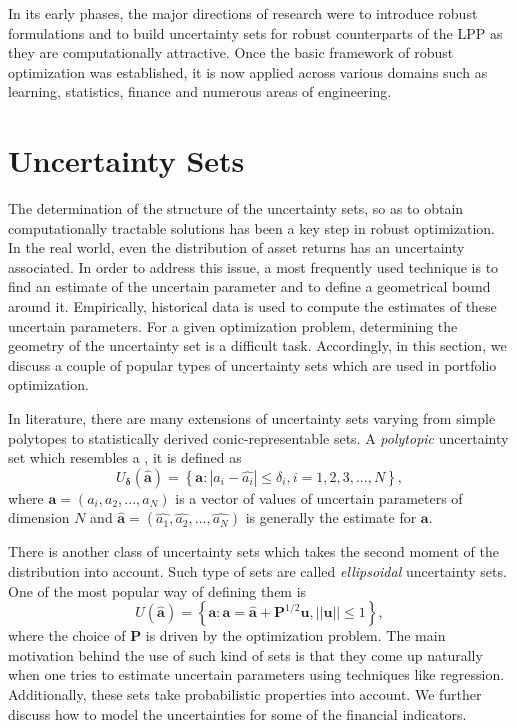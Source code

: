 In its early phases, the major directions of research were to introduce robust formulations and to build uncertainty sets for robust counterparts of the LPP as they are computationally attractive. Once the basic framework of robust optimization was established, it is now applied across various domains such as learning, statistics, finance and numerous areas of engineering.

\section{Uncertainty Sets}

The determination of the structure of the uncertainty sets, so as to obtain computationally tractable solutions has been a key step in robust optimization. In the real world, even the distribution of asset returns has an uncertainty associated. In order to address this issue, a most frequently used technique is to find an estimate of the uncertain parameter and to define a geometrical bound around it. Empirically, historical data is used to compute the estimates of these uncertain parameters. For a given optimization problem, determining the geometry of the uncertainty set is a difficult task. Accordingly, in this section, we discuss a couple of popular types of uncertainty sets which are used in portfolio optimization.

In literature, there are many extensions of uncertainty sets varying from simple polytopes to statistically derived conic-representable sets. A \textit{polytopic} \cite{fabozzi} uncertainty set which resembles a , it is defined as
\begin{equation}
\label{eqn:box}
U_{\mathbf{\delta}}(\hat{\mathbf{a}}) = \left\{ \mathbf{a} : | a_i - \hat{a_i}| \leq \delta_i, i = 1,2,3,...,N \right\},
\end{equation}
where $\mathbf{a} = (a_i, a_2, ..., a_N)$ is a vector of values of uncertain parameters of dimension $N$ and $\mathbf{\hat{a}} = (\hat{a_1}, \hat{a_2}, ... , \hat{a_N})$ is generally the estimate for $\mathbf{a}$.

There is another class of uncertainty sets which takes the second moment of the distribution into account. Such type of sets are called \textit{ellipsoidal} uncertainty sets. One of the most popular way of defining them \cite{fabozzi} is
\begin{equation}
\label{eqn:ellipse}
U(\hat{\mathbf{a}}) = \left\{ \mathbf{a} : \mathbf{a} = \hat{\mathbf{a}} + \mathbf{P}^{1/2}\mathbf{u}, ||\mathbf{u}||\leq 1 \right\},
\end{equation}
where the choice of $\mathbf{P}$ is driven by the optimization problem. The main motivation behind the use of such kind of sets is that they come up naturally when one tries to estimate uncertain parameters using techniques like regression. Additionally, these sets take probabilistic properties into account. We further discuss how to model the uncertainties for some of the financial indicators.

